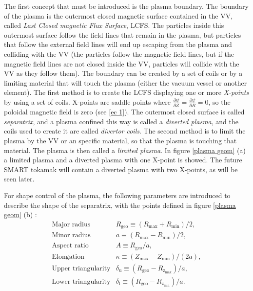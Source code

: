 \documentclass[a4paper,12pt,oneside]{book}
\newcommand{\p}{\partial}
\begin{document}
The first concept that must be introduced is the plasma boundary. The boundary of the plasma is the outermost closed magnetic surface contained in the VV, called \textit{Last Closed magnetic Flux Surface}, LCFS. The particles inside this outermost surface follow the field lines that remain in the plasma, but particles that follow the external field lines will end up escaping from the plasma and colliding with the VV (the particles follow the magnetic field lines, but if the magnetic field lines are not closed inside the VV, particles will collide with the VV as they follow them). The boundary can be created by a set of coils or by a limiting material that will touch the plasma (either the vacuum vessel or another element). The first method is to create the LCFS displaying one or more \textit{X-points} by using a set of coils. X-points are saddle points where $\frac{\p \psi}{\p Z}=\frac{\p \psi}{\p R}=0$, so the poloidal magnetic field is zero (see \eqref{ec 1}). The outermost closed surface is called \textit{separatrix}, and a plasma confined this way is called a \textit{diverted plasma}, and the coils used to create it are called \textit{divertor coils}. The second method is to limit the plasma by the VV or an specific material, so that the plasma is touching that material. The plasma is then called a \textit{limited plasma}. In figure \ref{plasma geom} (a) a limited plasma and a diverted plasma with one X-point is showed. The future SMART tokamak will contain a diverted plasma with two X-points, as will be seen later.

For shape control of the plasma, the following parameters are introduced to describe the shape of the separatrix, with the points defined in figure \ref{plasma geom} (b) \cite{Luce_2013}:
%
\begin{equation}\label{ec shape}
\begin{array}{cc}
\text{Major radius} & R_\text{geo} \equiv (R_\text{max}+R_\text{min})/2, 
\\
\text{Minor radius} & a \equiv (R_\text{max}-R_\text{min})/2,
\\
\text{Aspect ratio} & A \equiv R_\text{geo}/a,
\\
\text{Elongation} & \kappa \equiv (Z_\text{max}-Z_\text{min})/(2a),
\\
\text{Upper triangularity} & \delta_\text{u} \equiv (R_\text{geo}-R_{\text{z}_\text{max}})/a,
\\
\text{Lower triangularity} & \delta_\text{l} \equiv (R_\text{geo}-R_{\text{z}_\text{min}})/a.
\end{array}
\end{equation}
\end{document}
